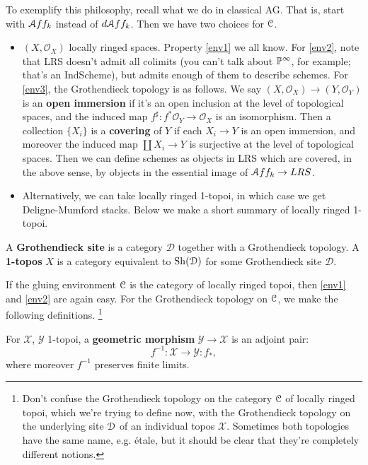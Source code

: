 To exemplify this philosophy, recall what we do in classical AG. That is, start with $\mathcal A ff_k$ instead of $d \mathcal A ff_k$. 
Then we have two choices for $\mathcal C$.
\begin{itemize}
\item $(X,\mathcal{O}_X)$ locally ringed spaces. Property \ref{env1} we all know. For \ref{env2}, note that LRS doesn't admit
all colimits (you can't talk about $\mathbb P^{\infty}$, for example; that's an IndScheme), but admits enough of them
to describe schemes. For \ref{env3}, the Grothendieck topology is as follows. We say $(X, \mathcal{O}_X) \to (Y,\mathcal{O}_Y)$ is an
\textbf{open immersion} if it's an open inclusion at the level of topological spaces, and the induced map $f^{\sharp}
: f^* \mathcal{O}_Y \to \mathcal{O}_X$ is an isomorphism. Then a collection $\{X_i\}$ is a \textbf{covering} of $Y$ if
each $X_i \to Y$ is an open immersion, and moreover the induced map $\coprod X_i \to Y$ is surjective at the level of topological
spaces. 
Then we can define schemes as objects in LRS which are covered, in the above sense, by objects in the essential
image of $\mathcal A ff_k \to LRS$.

\item Alternatively, we can take locally ringed 1-topoi, in which case we get Deligne-Mumford stacks. Below we make a short
summary of locally ringed 1-topoi.
\end{itemize}

\begin{defin}
A \textbf{Grothendieck site} is a category $\mathcal{D}$ together with a Grothendieck topology. A \textbf{1-topos} $X$
is a category equivalent to $\mathrm{Sh}(\mathcal{D})$ for some Grothendieck site $\mathcal{D}$.
\end{defin}

If the gluing environment $\mathcal C$ is the category of locally ringed topoi, then \ref{env1}
and \ref{env2} are again easy. For the Grothendieck topology on $\mathcal C$, we make the following definitions.
\footnote{Don't confuse the Grothendieck topology on the category $\mathcal C$ of locally ringed topoi, which we're trying to
define now, with the Grothendieck topology on the underlying site $\mathcal D$ of an individual topos $\mathcal{X}$. Sometimes
both topologies have the same name, e.g. \'etale, but it should be clear that they're completely different notions.}

\begin{defin}
For $\mathcal{X}$, $\mathcal{Y}$ 1-topoi, a \textbf{geometric morphism} $\mathcal{Y} \to \mathcal{X}$ is an adjoint pair:
\[	f^{-1} : \mathcal{X} \to \mathcal{Y} : f_*,	\] 
where moreover $f^{-1}$ preserves finite limits.
\end{defin}

